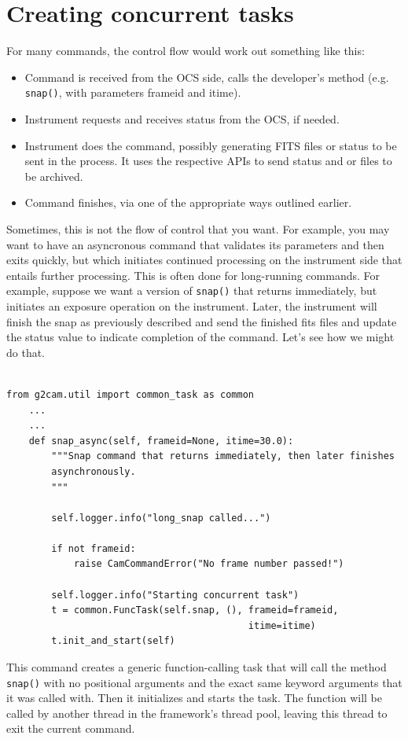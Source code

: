\documentclass[11pt]{report}
\begin{document}
\section{Creating concurrent tasks}
For many commands, the control flow would work out something like this:
\begin{itemize}
\item Command is received from the OCS side, calls the developer's method
      (e.g. {\tt snap()}, with parameters frameid and itime). 

\item Instrument requests and receives status from the OCS, if needed.

\item Instrument does the command, possibly generating FITS files or
    status to be sent in the process. It uses the respective APIs to
    send status and or files to be archived. 

\item Command finishes, via one of the appropriate ways outlined earlier.
\end{itemize}
Sometimes, this is not the flow of control that you want. For example,
you may want to have an asyncronous command that validates its
parameters and then exits quickly, but which initiates continued
processing on the instrument side that entails further processing. This
is often done for long-running commands. For example, suppose we want a
version of {\tt snap()} that returns immediately, but initiates an exposure
operation on the instrument. Later, the instrument will finish the snap
as previously described and send the finished fits files and update the
status value to indicate completion of the command. Let's see how we
might do that. 
\begin{verbatim}

from g2cam.util import common_task as common
    ...
    ...
    def snap_async(self, frameid=None, itime=30.0):
        """Snap command that returns immediately, then later finishes
        asynchronously.
        """

        self.logger.info("long_snap called...")

        if not frameid:
            raise CamCommandError("No frame number passed!")

        self.logger.info("Starting concurrent task")
        t = common.FuncTask(self.snap, (), frameid=frameid,
                                           itime=itime)
        t.init_and_start(self)

\end{verbatim}
This command creates a generic function-calling task that will call the
method {\tt snap()} with no positional arguments and the exact same keyword
arguments that it was called with. Then it initializes and starts the
task. The function will be called by another thread in the framework's
thread pool, leaving this thread to exit the current command. 
\end{document}
